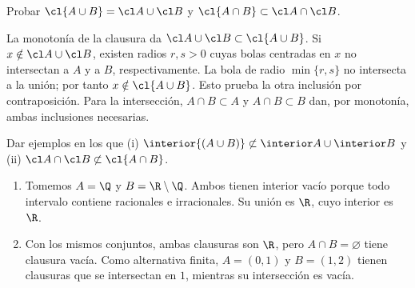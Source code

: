 \begin{ejercicio}\label{ej:lectura-2-3}
Probar $\cl{A\cup B}=\cl A\cup\cl B$ y $\cl{A\cap B}\subset\cl A\cap\cl B$.
\end{ejercicio}
\begin{solucion}
La monotonía de la clausura da $\cl A\cup\cl B\subset\cl{A\cup B}$. Si $x\notin\cl A\cup\cl B$, existen radios $r,s>0$ cuyas bolas centradas en $x$ no intersectan a $A$ y a $B$, respectivamente. La bola de radio $\min\{r,s\}$ no intersecta a la unión; por tanto $x\notin\cl{A\cup B}$. Esto prueba la otra inclusión por contraposición. Para la intersección, $A\cap B\subset A$ y $A\cap B\subset B$ dan, por monotonía, ambas inclusiones necesarias.
\end{solucion}

\begin{ejercicio}\label{ej:lectura-2-4}
Dar ejemplos en los que (i) $\interior{(A\cup B)}\not\subset\interior A\cup\interior B$ y (ii) $\cl A\cap\cl B\not\subset\cl{A\cap B}$.
\end{ejercicio}
\begin{solucion}
\begin{enumerate}[label=(\roman*)]
\item Tomemos $A=\Q$ y $B=\R\setminus\Q$. Ambos tienen interior vacío porque todo intervalo contiene racionales e irracionales. Su unión es $\R$, cuyo interior es $\R$.
\item Con los mismos conjuntos, ambas clausuras son $\R$, pero $A\cap B=\varnothing$ tiene clausura vacía. Como alternativa finita, $A=(0,1)$ y $B=(1,2)$ tienen clausuras que se intersectan en $1$, mientras su intersección es vacía.
\end{enumerate}
\end{solucion}

